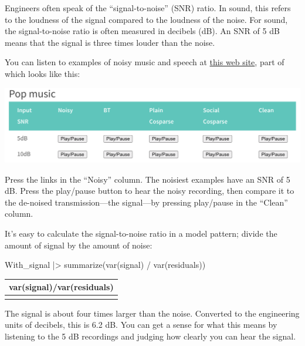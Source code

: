 \documentclass[
  letterpaper,
  DIV=11,
  numbers=noendperiod,
  oneside]{scrartcl}
\newenvironment{Shaded}{\begin{snugshade}}{\end{snugshade}}
\newcommand{\FunctionTok}[1]{\textcolor[rgb]{0.28,0.35,0.67}{#1}}
\newcommand{\NormalTok}[1]{\textcolor[rgb]{0.00,0.23,0.31}{#1}}
\newcommand{\SpecialCharTok}[1]{\textcolor[rgb]{0.37,0.37,0.37}{#1}}
\begin{document}
\begin{tcolorbox}[enhanced jigsaw, colbacktitle=quarto-callout-note-color!10!white, opacityback=0, breakable, opacitybacktitle=0.6, colback=white, coltitle=black, arc=.35mm, title=\textcolor{quarto-callout-note-color}{\faInfo}\hspace{0.5em}{Signal to noise ratio}, left=2mm, colframe=quarto-callout-note-color-frame, rightrule=.15mm, bottomrule=.15mm, leftrule=.75mm, bottomtitle=1mm, toptitle=1mm, titlerule=0mm, toprule=.15mm]

Engineers often speak of the ``signal-to-noise'' (SNR) ratio. In sound,
this refers to the loudness of the signal compared to the loudness of
the noise. For sound, the signal-to-noise ratio is often measured in
decibels (dB). An SNR of 5 dB means that the signal is three times
louder than the noise.

You can listen to examples of noisy music and speech at
\href{https://project.inria.fr/spare/denoising-examples/}{this web
site}, part of which looks like this:

\href{https://project.inria.fr/spare/denoising-examples/}{\includegraphics{www/SNR-site.png}}

Press the links in the ``Noisy'' column. The noisiest examples have an
SNR of 5 dB. Press the play/pause button to hear the noisy recording,
then compare it to the de-noised transmission---the signal---by pressing
play/pause in the ``Clean'' column.

It's easy to calculate the signal-to-noise ratio in a model pattern;
divide the amount of signal by the amount of noise:

\begin{Shaded}
\begin{Highlighting}[]
\NormalTok{With\_signal }\SpecialCharTok{|\textgreater{}}
  \FunctionTok{summarize}\NormalTok{(}\FunctionTok{var}\NormalTok{(signal) }\SpecialCharTok{/} \FunctionTok{var}\NormalTok{(residuals))}
\end{Highlighting}
\end{Shaded}

\begin{longtable}[]{@{}c@{}}
\toprule\noalign{}
var(signal)/var(residuals) \\
\midrule\noalign{}
\endhead
\bottomrule\noalign{}
\endlastfoot
4.2 \\
\end{longtable}

The signal is about four times larger than the noise. Converted to the
engineering units of decibels, this is 6.2 dB. You can get a sense for
what this means by listening to the 5 dB recordings and judging how
clearly you can hear the signal.

\end{tcolorbox}
\end{document}
